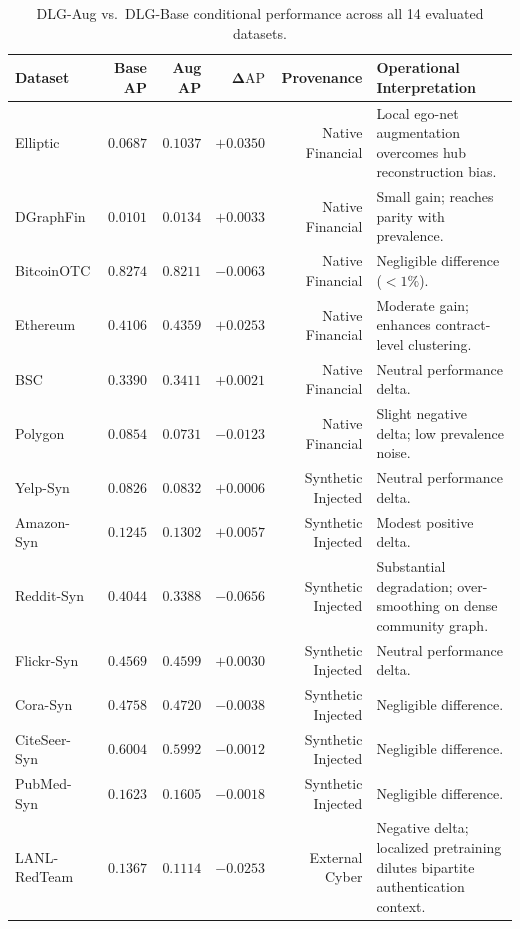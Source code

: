 \documentclass[applsci,article,submit,moreauthors,pdftex]{Definitions/mdpi}
\begin{document}
\begin{table}[htbp]
\centering\small
\caption{DLG-Aug vs.\ DLG-Base conditional performance across all 14 evaluated datasets.}
\label{tab:conditional_delta}
\begin{tabularx}{\textwidth}{lrrrrX}\toprule
\textbf{Dataset} & \textbf{Base AP} & \textbf{Aug AP} & $\mathbf{\Delta\mathrm{AP}}$ & \textbf{Provenance} & \textbf{Operational Interpretation} \\\midrule
Elliptic & $0.0687$ & $0.1037$ & $\mathbf{+0.0350}$ & Native Financial & Local ego-net augmentation overcomes hub reconstruction bias. \\
DGraphFin & $0.0101$ & $0.0134$ & $+0.0033$ & Native Financial & Small gain; reaches parity with prevalence. \\
BitcoinOTC & $0.8274$ & $0.8211$ & $-0.0063$ & Native Financial & Negligible difference ($<1\%$). \\
Ethereum & $0.4106$ & $0.4359$ & $\mathbf{+0.0253}$ & Native Financial & Moderate gain; enhances contract-level clustering. \\
BSC & $0.3390$ & $0.3411$ & $+0.0021$ & Native Financial & Neutral performance delta. \\
Polygon & $0.0854$ & $0.0731$ & $-0.0123$ & Native Financial & Slight negative delta; low prevalence noise. \\
Yelp-Syn & $0.0826$ & $0.0832$ & $+0.0006$ & Synthetic Injected & Neutral performance delta. \\
Amazon-Syn & $0.1245$ & $0.1302$ & $+0.0057$ & Synthetic Injected & Modest positive delta. \\
Reddit-Syn & $0.4044$ & $0.3388$ & $\mathbf{-0.0656}$ & Synthetic Injected & Substantial degradation; over-smoothing on dense community graph. \\
Flickr-Syn & $0.4569$ & $0.4599$ & $+0.0030$ & Synthetic Injected & Neutral performance delta. \\
Cora-Syn & $0.4758$ & $0.4720$ & $-0.0038$ & Synthetic Injected & Negligible difference. \\
CiteSeer-Syn & $0.6004$ & $0.5992$ & $-0.0012$ & Synthetic Injected & Negligible difference. \\
PubMed-Syn & $0.1623$ & $0.1605$ & $-0.0018$ & Synthetic Injected & Negligible difference. \\\midrule
LANL-RedTeam & $0.1367$ & $0.1114$ & $\mathbf{-0.0253}$ & External Cyber & Negative delta; localized pretraining dilutes bipartite authentication context. \\\bottomrule
\end{tabularx}
\end{table}
\end{document}
